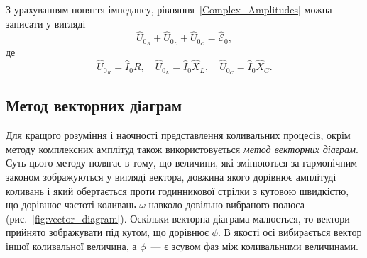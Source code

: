 З урахуванням поняття імпедансу, рівняння~\eqref{Complex_Amplitudes} можна записати у вигляді
\begin{equation}\label{eq:S_sumU}
	\hat{U}_{0_R} + \hat{U}_{0_L} + \hat{U}_{0_C} = \hat{\mathcal{E}}_{0},
\end{equation}
де
\begin{equation}\label{eq:U}
	\hat{U}_{0_R} = \hat{I}_{0} R, \quad \hat{U}_{0_L} = \hat{I}_{0} \hat{X}_L, \quad \hat{U}_{0_C} = \hat{I}_{0} \hat{X}_C.
\end{equation}


\subsection{Метод векторних діаграм}

Для кращого розуміння і наочності представлення коливальних процесів, окрім методу комплексних амплітуд також використовується \emph{метод векторних діаграм}. Суть цього методу полягає в тому, що величини, які змінюються за гармонічним законом зображуються у вигляді вектора, довжина якого дорівнює амплітуді коливань і який обертається проти годинникової стрілки з кутовою швидкістю, що дорівнює частоті коливань $\omega$ навколо довільно вибраного полюса (рис.~\ref{fig:vector_diagram}). Оскільки векторна діаграма малюється, то вектори прийнято зображувати під кутом, що дорівнює $\phi$. В якості осі вибирається вектор іншої коливальної величина, а $\phi$~--- є зсувом фаз між коливальними величинами.

